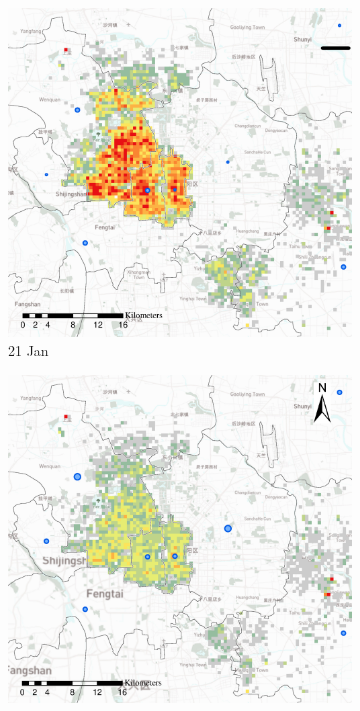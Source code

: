 \documentclass[preprints,ijgi,submit,moreauthors]{Definitions/mdpi}
\begin{document}
\begin{figure}[ht]
    \centering
    \begin{subfigure}{.3\textwidth}
        \includegraphics[width=\textwidth]{Figures/Relation_with_confrimed_cases/NewDistrictSSBD2020_01_21.eps}
        \caption{21 Jan}
    \end{subfigure}
    \begin{subfigure}{.3\textwidth}
        \includegraphics[width=\textwidth]{Figures/Relation_with_confrimed_cases/NewDistrictSSBD2020_01_25.eps}

\end{subfigure}
\end{figure}
\end{document}
